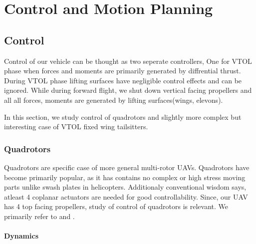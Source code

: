\section{Control and Motion Planning}

\subsection{Control}
Control of our vehicle can be thought as two seperate controllers, One for VTOL phase when forces and moments are primarily generated by diffrential thrust. During VTOL phase lifting surfaces have negligible control effects and can be ignored. While during forward flight, we shut down vertical facing propellers and all all forces, moments are generated by lifting surfaces(wings, elevons).

In this section, we study control of quadrotors and slightly more complex but interesting case of VTOL fixed wing tailsitters.

\subsubsection{Quadrotors}
Quadrotors are specific case of more general multi-rotor UAVs. Quadrotors have become primarily popular, as it has contains no complex or high stress moving parts unlike swash plates in helicopters. Additionaly conventional wisdom says, atleast 4 coplanar actuators are needed for good controllability. Since, our UAV has 4 top facing propellers, study of control of quadrotors is relevant. We primarily refer to \cite{mellinger2011minimum} and \cite{lee2010geometric}.


\paragraph{Dynamics}
